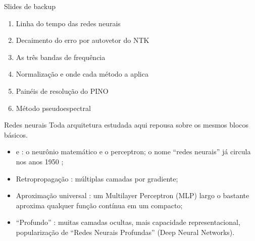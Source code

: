 
\begin{frame}{Slides de backup}
  \begin{enumerate}
    \item Linha do tempo das redes neurais
    \item Decaimento do erro por autovetor do NTK
    \item As três bandas de frequência
    \item Normalização e onde cada método a aplica
    \item Painéis de resolução do PINO
    \item Método pseudoespectral
  \end{enumerate}
\end{frame}

\begin{frame}{Redes neurais}
  Toda arquitetura estudada aqui repousa sobre os mesmos blocos básicos.
  \vspace{2pt}
  \begin{center}
  \end{center}
  \vspace{2pt}
  \begin{itemize}
    \item \textcite{mcculloch1943} e \textcite{rosenblatt1958}: o neurônio matemático e o
          perceptron; o nome ``redes neurais'' já circula nos anos 1950
          \parencite{minsky1954};
    \item Retropropagação \parencite{rumelhart1986}: múltiplas camadas por gradiente;
    \item Aproximação universal \parencite{cybenko1989, hornik1989}: um Multilayer
          Perceptron (MLP) largo o bastante aproxima qualquer função contínua em
          um compacto;
    \item ``Profundo'' \parencite{lecun2015deep}: muitas camadas ocultas, mais
          capacidade representacional, popularização de ``Redes Neurais Profundas'' (Deep Neural Networks).
  \end{itemize}
\end{frame}

